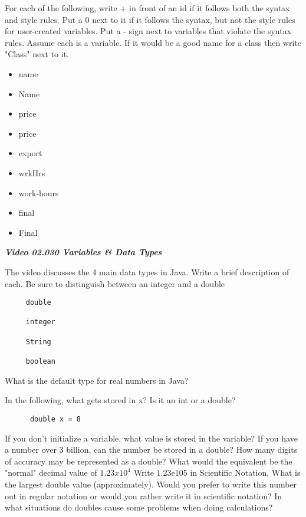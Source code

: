 \documentclass[letter,11pt]{exam}
\begin{document}
\begin{questions}
\begin{samepage}
\question  For each of the following, write + in front of an id if it follows both the syntax and style rules.  Put a 0 next to it if it follows the syntax, but not the style rules for user-created variables.  Put a - sign next to variables that violate the syntax rules.  Assume each is a variable.  If it would be a good name for a class then write "Class" next to it.
\begin{itemize}
  \item  name 
  \item  Name 
  \item  price 
  \item  price 
  \item  export
  \item  wrkHrs
  \item  work-hours
  \item  final
  \item  Final
\end{itemize}
\end{samepage}

\textit{\textbf{Video 02.030 Variables \& Data Types}}

\begin{samepage}
\question The video discusses the 4 main data types in Java.  Write a brief description of each.  Be sure to distinguish between an integer and a double
\end{samepage}
\begin{samepage}
\begin{verbatim}
     double

     integer

     String

     boolean
\end{verbatim}
\end{samepage}
\question What is the default type for real numbers in Java?
\begin{samepage}
\question In the following, what gets stored in x?  Is it an int or a double?
\begin{verbatim}
      double x = 8
\end{verbatim}
\end{samepage}
\question If you don't initialize a variable, what value is stored in the variable?
\question If you have a number over 3 billion, can the number be stored in a double?
\question How many digits of accuracy may be represented as a double?
\question What would the equivalent be the "normal" decimal value of $1.23 x 10^4$
\question Write 1.23e105 in Scientific Notation.
\question What is the largest double value (approximately).  Would you prefer to write this number out in regular notation or would you rather write it in scientific notation?
\question In what situations do doubles cause some problems when doing calculations?


\end{questions}
\end{document}
